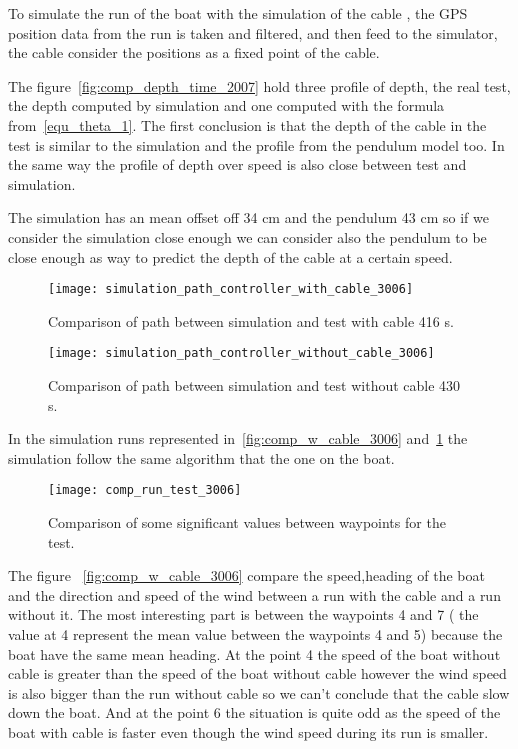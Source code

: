 To simulate the run of the boat with the simulation of the cable , the \gls{GPS} position data from the run is taken and filtered, and then feed to the simulator, the cable consider the positions as a fixed point of the cable.

The figure~\ref{fig:comp_depth_time_2007} hold three profile of depth, the real test, the depth computed by simulation and one computed with the formula from~\ref{equ_theta_1}. The first conclusion is that the depth of the cable in the test is similar to the simulation and the profile from the pendulum model too.
 In the same way the profile of depth over speed is also close between test and simulation.
 
 The simulation has an mean offset off 34 cm and the pendulum  43 cm so if we consider the simulation close enough we can consider also the pendulum to be close enough as way to predict the depth of the cable at a certain speed.
 
 \begin{figure}[H]
\centering
    \begin{minipage}[b]{0.4\textwidth}
    \centering
    \texttt{[image: simulation\_path\_controller\_with\_cable\_3006]}
    \caption{Comparison of path between simulation and test with cable 416 s.}
    \label{fig:comp_w_cable_3006}
    \end{minipage}
    \hfill
    \begin{minipage}[b]{0.45\textwidth}
    \centering
    \texttt{[image: simulation\_path\_controller\_without\_cable\_3006]}
    \caption{Comparison of path between simulation and test without cable 430 s.}
    \label{fig:comp_wt_cable_3006}
    \end{minipage}
\end{figure}

In the simulation runs represented in~\ref{fig:comp_w_cable_3006} and~\ref{fig:comp_wt_cable_3006} the simulation follow the same algorithm that the one on the boat.

 \begin{figure}[H]
    \centering
    \texttt{[image: comp\_run\_test\_3006]}
    \caption{Comparison of some significant values between waypoints for the test.}
    \label{fig:comp_run_306}
\end{figure}

The figure ~\ref{fig:comp_w_cable_3006} compare the speed,heading of the boat and the direction and speed of the wind between a run with the cable and a run without it. The most interesting part is between the waypoints 4 and 7 ( the value at 4 represent the mean value between the waypoints 4 and 5)  because the boat have the same mean heading. At the point 4 the speed of the boat without cable is greater than the speed of the boat without cable however the wind speed is also bigger than the run without cable so we can't conclude that the cable slow down the boat. And at the point 6 the situation is quite odd as the speed of the boat with cable is faster 
even though the wind speed during its run is smaller.


